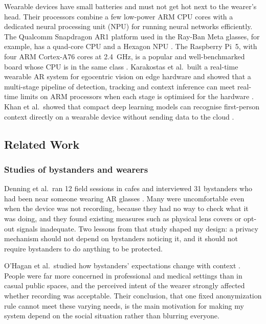 Wearable devices have small batteries and must not get hot next to the wearer's head.
Their processors combine a few low-power ARM CPU cores with a dedicated neural processing
unit (NPU) for running neural networks efficiently. The Qualcomm Snapdragon AR1 platform
used in the Ray-Ban Meta glasses, for example, has a quad-core CPU and a Hexagon NPU
\cite{qcom_ar1}. The Raspberry Pi~5, with four ARM Cortex-A76 cores at 2.4~GHz, is a
popular and well-benchmarked board whose CPU is in the same class \cite{ultralytics_rpi}.
Karakostas et al.\ built a real-time wearable AR system for egocentric vision on edge
hardware and showed that a multi-stage pipeline of detection, tracking and context
inference can meet real-time limits on ARM processors when each stage is optimised for the
hardware \cite{karakostas2024}. Khan et al.\ showed that compact deep learning models can
recognise first-person context directly on a wearable device without sending data to the
cloud \cite{khan2021}.

\subsection{Related Work}
\label{sec:lit_related}

\subsubsection{Studies of bystanders and wearers}

Denning et al.\ ran 12 field sessions in cafes and interviewed 31 bystanders who had been
near someone wearing AR glasses \cite{denning2014}. Many were uncomfortable even when the
device was not recording, because they had no way to check what it was doing, and they
found existing measures such as physical lens covers or opt-out signals inadequate. Two
lessons from that study shaped my design: a privacy mechanism should not depend on
bystanders noticing it, and it should not require bystanders to do anything to be
protected.

O'Hagan et al.\ studied how bystanders' expectations change with context
\cite{ohagan2023}. People were far more concerned in professional and medical settings than
in casual public spaces, and the perceived intent of the wearer strongly affected whether
recording was acceptable. Their conclusion, that one fixed anonymization rule cannot meet
these varying needs, is the main motivation for making my system depend on the social
situation rather than blurring everyone.

